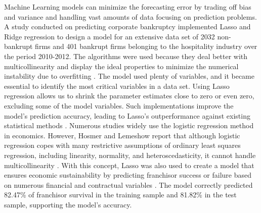 \documentclass[12pt,oneside]{book} %
\begin{document}
Machine Learning models can minimize the forecasting error by trading off bias and variance and handling vast amounts of data focusing on prediction problems. A study conducted on predicting corporate bankruptcy implemented Lasso and Ridge regression to design a model for an extensive data set of 2032 non-bankrupt firms and 401 bankrupt firms belonging to the hospitality industry over the period 2010-2012. The algorithms were used because they deal better with multicollinearity and display the ideal properties to minimize the numerical instability due to overfitting \cite{pereira2016logistic}. The model used plenty of variables, and it became essential to identify the most critical variables in a data set. Using Lasso regression allows us to shrink the parameter estimates close to zero or even zero, excluding some of the model variables. Such implementations improve the model's prediction accuracy, leading to Lasso's outperformance against existing statistical methods \cite{wang2018predicting}. Numerous studies widely use the logistic regression method in economics. However, Hosmer and Lemeshow report that although logistic regression copes with many restrictive assumptions of ordinary least squares regression, including linearity, normality, and heteroscedasticity, it cannot handle multicollinearity \cite{hosmer2013applied}. With this concept, Lasso was also used to create a model that ensures economic sustainability by predicting franchisor success or failure based on numerous financial and contractual variables \cite{calderon2017economic}. The model correctly predicted 82.47\% of franchisor survival in the training sample and 81.82\% in the test sample, supporting the model's accuracy.
\end{document}
